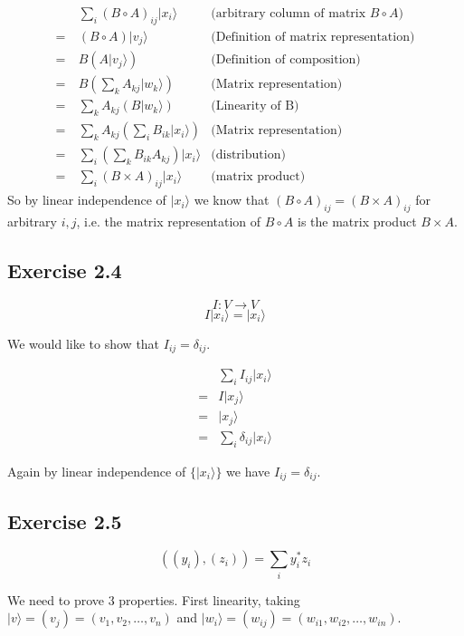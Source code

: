\documentclass[]{article}
\begin{document}
\begin{align*}
&\sum_i (B \circ A)_{ij} |x_i\rangle &\text{(arbitrary column of matrix $B \circ A$)}\\
=\ &(B \circ A)|v_j\rangle &\text{(Definition of matrix representation)}\\
=\ &B(A|v_j\rangle) &\text{(Definition of composition)}\\
=\ &B\left(\sum_k A_{kj} |w_k\rangle\right) &\text{(Matrix representation)}\\
=\ &\sum_k A_{kj} (B |w_k\rangle) &\text{(Linearity of B)}\\
=\ &\sum_k A_{kj} \left( \sum_i B_{ik} |x_i\rangle \right) &\text{(Matrix representation)}\\
=\ &\sum_i \left(\sum_k B_{ik} A_{kj}\right) |x_i\rangle &\text{(distribution)}\\
=\ &\sum_i (B \times A)_{ij} |x_i\rangle &\text{(matrix product)}
\end{align*}
So by linear independence of $|x_i\rangle$ we know that $(B \circ A)_{ij} = (B \times A)_{ij}$ for arbitrary $i, j$, i.e. the matrix representation of $B \circ A$ is the matrix product $B \times A$.

\subsection{Exercise 2.4}

\[I: V \to V\]
\[I|x_i\rangle = |x_i\rangle\]

We would like to show that $I_{ij} = \delta_{ij}$.

\begin{align*}
&\sum_i I_{ij} |x_i\rangle \\
= &I|x_j\rangle \\
= &|x_j\rangle \\
= &\sum_i \delta_{ij}|x_i\rangle
\end{align*}

Again by linear independence of $\{|x_i\rangle\}$ we have $I_{ij} = \delta_{ij}$.

\subsection{Exercise 2.5}

\[((y_i), (z_i)) = \sum_i y_i^*z_i\]

We need to prove 3 properties. First linearity, taking $|v\rangle = (v_j) = (v_1, v_2, \ldots, v_n)$ and $|w_i\rangle = (w_{ij}) = (w_{i1}, w_{i2}, \ldots, w_{in})$.
\end{document}
